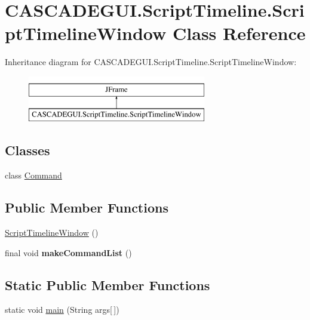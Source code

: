 \hypertarget{classCASCADEGUI_1_1ScriptTimeline_1_1ScriptTimelineWindow}{\section{C\-A\-S\-C\-A\-D\-E\-G\-U\-I.\-Script\-Timeline.\-Script\-Timeline\-Window Class Reference}
\label{classCASCADEGUI_1_1ScriptTimeline_1_1ScriptTimelineWindow}
}
Inheritance diagram for C\-A\-S\-C\-A\-D\-E\-G\-U\-I.\-Script\-Timeline.\-Script\-Timeline\-Window\-:\begin{figure}[H]
\begin{center}
\leavevmode
\includegraphics[height=2.000000cm]{classCASCADEGUI_1_1ScriptTimeline_1_1ScriptTimelineWindow}
\end{center}
\end{figure}
\subsection*{Classes}
\begin{DoxyCompactItemize}
\item 
class \hyperlink{classCASCADEGUI_1_1ScriptTimeline_1_1ScriptTimelineWindow_1_1Command}{Command}
\end{DoxyCompactItemize}
\subsection*{Public Member Functions}
\begin{DoxyCompactItemize}
\item 
\hyperlink{classCASCADEGUI_1_1ScriptTimeline_1_1ScriptTimelineWindow_ad93a50b0e02228b03b729891a6e1108b}{Script\-Timeline\-Window} ()
\item 
\hypertarget{classCASCADEGUI_1_1ScriptTimeline_1_1ScriptTimelineWindow_af2468ff8d75c9f1412178e969dd50455}{final void {\bfseries make\-Command\-List} ()}\label{classCASCADEGUI_1_1ScriptTimeline_1_1ScriptTimelineWindow_af2468ff8d75c9f1412178e969dd50455}

\end{DoxyCompactItemize}
\subsection*{Static Public Member Functions}
\begin{DoxyCompactItemize}
\item 
static void \hyperlink{classCASCADEGUI_1_1ScriptTimeline_1_1ScriptTimelineWindow_a63af12c553b67dc10b025320564443a5}{main} (String args\mbox{[}$\,$\mbox{]})
\end{DoxyCompactItemize}


